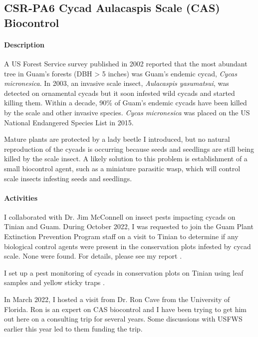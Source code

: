 \subsection{CSR-PA6 Cycad Aulacaspis Scale (CAS) Biocontrol}
\label{CASbiocontrol}
\begin{refsection}

\paragraph{Description}

A US Forest Service survey published in 2002 reported that the most
abundant tree in Guam's forests (DBH > 5 inches) was Guam's endemic
cycad, \emph{Cycas micronesica}. In 2003, an invasive scale insect,
\emph{Aulacaspis yasumatsui}, was detected on ornamental cycads but
it soon infested wild cycads and started killing them. Within a decade,
90\% of Guam\textquoteright s endemic cycads have been killed by the
scale and other invasive species. \emph{Cycas micronesica} was placed
on the US National Endangered Species List in 2015.

Mature plants are protected by a lady beetle I introduced, but no
natural reproduction of the cycads is occurring because seeds and seedlings are
still being killed by the scale insect. A likely solution to this
problem is establishment of a small biocontrol agent, such as a miniature
parasitic wasp, which will control scale insects infesting seeds and
seedlings.


\paragraph{Activities}

I collaborated with Dr. Jim McConnell on insect pests impacting cycads on Tinian and Guam. During October 2022, I was requested to join the Guam Plant Extinction Prevention Program staff on a visit to Tinian to determine if any biological control agents were present in the conservation plots infested by cycad scale. None were found. For details, please see my report \cite{mooreGitHubRepositoryAubreymoore}.

I set up a pest monitoring of cycads in conservation plots on Tinian using leaf samples \cite{moore_monitoring_2022} and yellow sticky traps \cite{moore_monitoring_2022-1}.

In March 2022, I hosted a visit from Dr. Ron Cave from the University of Florida. Ron is an expert on CAS biocontrol and I have been trying to get him out here on a consulting trip for several years. Some discussions with USFWS earlier this year led to them funding the trip.


\end{refsection}
